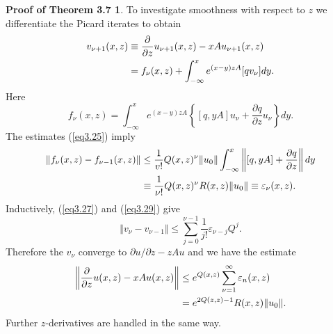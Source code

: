 \documentclass{surv-l}
\theoremstyle{plain}
\theoremstyle{definition}
\newtheorem*{pothm}{\sc Proof of Theorem 3.7}
\numberwithin{equation}{chapter}
\begin{document}
\begin{pothm}
To investigate smoothness with respect to $z$ we differentiate the Picard iterates to obtain
\begin{align}\label{eq3.27}
v_{\nu+1}(x, z)&\equiv\frac{\partial}{\partial z}u_{\nu+1}(x,z)-xAu_{\nu+1}(x,z)\\ \notag
&=f_{\nu}(x, z)+\int_{-\infty}^{x}e^{(x-y)zA}[qv_{\nu}]dy.
\end{align}
Here
\begin{equation}\label{eq3.28}
f_{\nu}(x, z)=\int_{-\infty}^{x}e^{(x-y)zA}\left\{[q,yA]u_{\nu}+\frac{\partial q}{\partial z}u_{\nu}\right\}dy.
\end{equation}
The estimates (\ref{eq3.25}) imply
\begin{align}\label{eq3.29}
\Vert f_{\nu}(x,z)-f_{\nu-1}(x,z)\displaystyle \Vert & \leq\frac{1}{v!}Q(x, z)^{\nu}\Vert u_{0}\Vert\int_{-\infty}^{x}\left\Vert[q, yA]+\frac{\partial q}{\partial z}\right\Vert dy\\ \notag
&\equiv\frac{1}{\nu!}Q(x, z)^{\nu}R(x, z)\Vert u_{0}\Vert\equiv\varepsilon_{\nu}(x, z).
\end{align}
Inductively, (\ref{eq3.27}) and (\ref{eq3.29}) give
\begin{equation}\label{3.30}
\Vert v_{\nu}-v_{\nu-1}\Vert\leq\sum_{j=0}^{\nu-1}\frac{1}{j!}\varepsilon_{\nu-j}Q^{j}.
\end{equation}
Therefore the $v_{\nu}$ converge to $\partial u/\partial z-zAu$ and we have the estimate
\begin{align}\label{eq3.31}
\left\Vert\frac{\partial}{\partial z}u(x,z)-xAu(x,z)\right\Vert &\leq e^{Q(x, z)}\sum_{\nu=1}^{\infty}\varepsilon_{n}(x,z)\\ \notag
&=e^{2Q(z,z)-1}R(x,z)\Vert u_{0}\Vert.
\end{align}
Further $z$-derivatives are handled in the same way.
\end{pothm}
\end{document}
